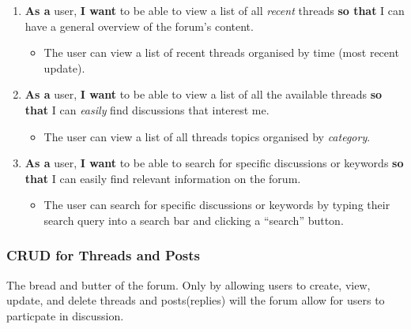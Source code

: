 \documentclass[10pt]{exam}
\providecommand{\tightlist}{%
  \setlength{\itemsep}{0pt}\setlength{\parskip}{0pt}}
\begin{document}
\begin{enumerate}
\def\labelenumi{\arabic{enumi}.}
\tightlist
\item
  \textbf{As a} user, \textbf{I want} to be able to view a list of all
  \emph{recent} threads \textbf{so that} I can have a general overview
  of the forum's content.

  \begin{itemize}
  \tightlist
  \item
    The user can view a list of recent threads organised by time (most
    recent update).
  \end{itemize}
\item
  \textbf{As a} user, \textbf{I want} to be able to view a list of all
  the available threads \textbf{so that} I can \emph{easily} find
  discussions that interest me.

  \begin{itemize}
  \tightlist
  \item
    The user can view a list of all threads topics organised by
    \emph{category}.
  \end{itemize}
\item
  \textbf{As a} user, \textbf{I want} to be able to search for specific
  discussions or keywords \textbf{so that} I can easily find relevant
  information on the forum.

  \begin{itemize}
  \tightlist
  \item
    The user can search for specific discussions or keywords by typing
    their search query into a search bar and clicking a ``search''
    button.
  \end{itemize}
\end{enumerate}

\hypertarget{crud-for-threads-and-posts}{%
\subsubsection{CRUD for Threads and
Posts}\label{crud-for-threads-and-posts}}

The bread and butter of the forum. Only by allowing users to create,
view, update, and delete threads and posts(replies) will the forum allow
for users to particpate in discussion.
\end{document}
